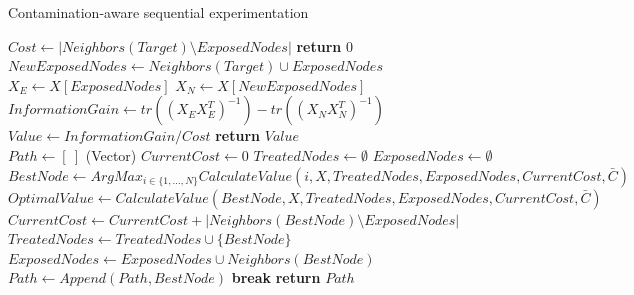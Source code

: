 \documentclass[11pt,a4paper]{article}
\begin{document}
\begin{algorithm}[!h] 
    \caption{Contamination-aware sequential experimentation}
    \label{cmu_sampling}
    \begin{algorithmic}[] %
        \State $Cost \gets |Neighbors(Target) \setminus ExposedNodes|$
             \State \textbf{return} 0
            \Else
            \State $NewExposedNodes\gets Neighbors(Target) \cup ExposedNodes$
            \State $X_{E} \gets X[ExposedNodes]$
            \State $X_{N} \gets X[NewExposedNodes]$            
            \State $InformationGain \gets tr( (X_{E} X_{E} ^T) ^ {-1} ) - tr( (X_{N} X_{N} ^T) ^ {-1} )$
            \State $Value \gets InformationGain/Cost$
            \State \textbf{return} $Value$
            \EndIf
        \EndFunction
        \\\hrulefill
            \State $Path \gets [~]$ (Vector)
            \State $Current Cost \gets 0$
            \State $Treated Nodes \gets \emptyset$
            \State $Exposed Nodes \gets \emptyset$
                \State $Best Node \gets ArgMax_{i \in \{1,\dots, N\}} Calculate Value(i, X, TreatedNodes, ExposedNodes,Current Cost, \bar{C})$
                \State $Optimal Value \gets Calculate Value(Best Node, X, TreatedNodes, ExposedNodes,Current Cost, \bar{C})$
                \State $Current Cost \gets Current Cost + |Neighbors(Best Node) \setminus ExposedNodes|$
                \State $Treated Nodes \gets Treated Nodes \cup \{Best Node\}$
                \State $Exposed Nodes \gets Exposed Nodes \cup Neighbors(Best Node)$
                \State $Path \gets Append(Path, BestNode)$    
                \Else
                \State \textbf{break} 
                \EndIf            
            \EndWhile\label{euclidendwhile}
            \State \textbf{return} $Path$
        \EndFunction
      \end{algorithmic}
\end{algorithm}
\end{document}
